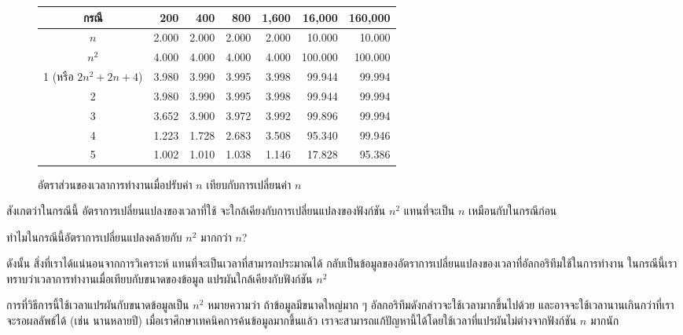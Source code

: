 \begin{figure}
{\small
\begin{center}
\begin{tabular}{|c|r|r|r|r|r|r|}
\hline
กรณี & 200 & 400 & 800 & 1,600 & 16,000 & 160,000\\
\hline
$n$ & 2.000 & 2.000 & 2.000 & 2.000 & 10.000 & 10.000\\
$n^2$ & 4.000 & 4.000 & 4.000 & 4.000 & 100.000 & 100.000\\
1 (หรือ $2n^2 + 2n + 4$) & 3.980 & 3.990 & 3.995 & 3.998 & 99.944 & 99.994\\
2 & 3.980 & 3.990 & 3.995 & 3.998 & 99.944 & 99.994\\
3 & 3.652 & 3.900 & 3.972 & 3.992 & 99.896 & 99.994\\
4 & 1.223 & 1.728 & 2.683 & 3.508 & 95.340 & 99.946\\
5 & 1.002 & 1.010 & 1.038 & 1.146 & 17.828 & 95.386\\
\hline
\end{tabular}
\end{center}
}
\caption{อัตราส่วน{\wbr}ของ{\wbr}เวลา{\wbr}การ{\wbr}ทำงาน{\wbr}เมื่อ{\wbr}ปรับ{\wbr}ค่า $n$ เทียบ{\wbr}กับ{\wbr}การ{\wbr}เปลี่ยน{\wbr}ค่า $n$}
\label{fig:analysis-runtimes-by-n-2-div}
\end{figure}

สังเกต{\wbr}ว่า{\wbr}ใน{\wbr}กรณี{\wbr}นี้ อัตรา{\wbr}การ{\wbr}เปลี่ยนแปลง{\wbr}ของ{\wbr}เวลา{\wbr}ที่{\wbr}ใช้{\wbr}
จะ{\wbr}ใกล้เคียง{\wbr}กับ{\wbr}การ{\wbr}เปลี่ยนแปลง{\wbr}ของ{\wbr}ฟังก์ชัน $n^2$ แทน{\wbr}ที่{\wbr}จะ{\wbr}เป็น $n$ เหมือน{\wbr}กับ{\wbr}ใน{\wbr}กรณี{\wbr}ก่อน{\wbr}

\begin{quiz}{}
ทำไม{\wbr}ใน{\wbr}กรณี{\wbr}นี้{\wbr}อัตรา{\wbr}การ{\wbr}เปลี่ยนแปลง{\wbr}คล้าย{\wbr}กับ $n^2$ มาก{\wbr}กว่า $n$?
\end{quiz}

ดังนั้น สิ่ง{\wbr}ที่{\wbr}เรา{\wbr}ได้{\wbr}แน่นอน{\wbr}จาก{\wbr}การ{\wbr}วิเคราะห์ แทน{\wbr}ที่{\wbr}จะ{\wbr}เป็น{\wbr}เวลา{\wbr}ที่{\wbr}สามารถ{\wbr}ประมาณ{\wbr}ได้{\wbr}
กลับ{\wbr}เป็น{\wbr}ข้อมูล{\wbr}ของ{\wbr}อัตรา{\wbr}การ{\wbr}เปลี่ยนแปลง{\wbr}ของ{\wbr}เวลา{\wbr}ที่{\wbr}อัล{\wbr}กอ{\wbr}ริ{\wbr}ทึม{\wbr}ใช้{\wbr}ใน{\wbr}การ{\wbr}ทำงาน{\wbr}
ใน{\wbr}กรณี{\wbr}นี้{\wbr}เรา{\wbr}ทราบ{\wbr}ว่า{\wbr}เวลา{\wbr}การ{\wbr}ทำงาน{\wbr}เมื่อ{\wbr}เทียบ{\wbr}กับ{\wbr}ขนาด{\wbr}ของ{\wbr}ข้อมูล แปรผัน{\wbr}ใกล้เคียง{\wbr}กับ{\wbr}ฟังก์ชัน{\wbr}
$n^2$

การ{\wbr}ที่{\wbr}วิธีการ{\wbr}นี้{\wbr}ใช้เวลา{\wbr}แปรผัน{\wbr}กับ{\wbr}ขนาด{\wbr}ข้อมูล{\wbr}เป็น $n^2$ หมายความ{\wbr}ว่า ถ้า{\wbr}ข้อมูล{\wbr}มี{\wbr}ขนาด{\wbr}ใหญ่{\wbr}มาก{\wbr}
ๆ อัล{\wbr}กอ{\wbr}ริ{\wbr}ทึม{\wbr}ดังกล่าว{\wbr}จะ{\wbr}ใช้เวลา{\wbr}มาก{\wbr}ขึ้น{\wbr}ไป{\wbr}ด้วย{\wbr}
และ{\wbr}อาจ{\wbr}จะ{\wbr}ใช้เวลา{\wbr}นาน{\wbr}เกิน{\wbr}กว่า{\wbr}ที่{\wbr}เรา{\wbr}จะ{\wbr}รอ{\wbr}ผลลัพธ์{\wbr}ได้ (เช่น นาน{\wbr}หลาย{\wbr}ปี)
เมื่อ{\wbr}เรา{\wbr}ศึกษา{\wbr}เทคนิค{\wbr}การ{\wbr}ค้น{\wbr}ข้อมูล{\wbr}มาก{\wbr}ขึ้น{\wbr}แล้ว{\wbr}
เรา{\wbr}จะ{\wbr}สามารถ{\wbr}แก้{\wbr}ปัญหา{\wbr}นี้{\wbr}ได้{\wbr}โดย{\wbr}ใช้เวลา{\wbr}ที่{\wbr}แปรผัน{\wbr}ไม่{\wbr}ต่าง{\wbr}จาก{\wbr}ฟังก์ชัน $n$ มาก{\wbr}นัก{\wbr}

